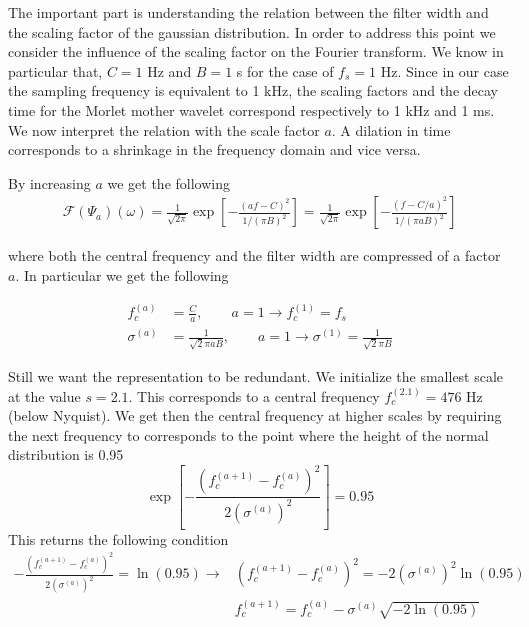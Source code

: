 \documentclass[a4paper]{article}
\begin{document}
The important part is understanding the relation between the filter width and the scaling factor of the gaussian distribution. In order to address this point we consider the influence of the scaling factor on the Fourier transform.
We know in particular that, $C=1$ Hz and $B=1$ s for the case of $f_s=1$ Hz. Since in our case the sampling frequency is equivalent to 1 kHz, the scaling factors and the decay time for the Morlet mother wavelet correspond respectively to 1 kHz and 1 ms.
We now interpret the relation with the scale factor $a$. A dilation in time corresponds to a shrinkage in the frequency domain and vice versa.

By increasing $a$ we get the following
\begin{align*}
 \mathcal{F}(\Psi_a)(\omega) = \frac{1}{\sqrt{2\pi}} \exp\left[-\frac{(a f - C)^2}{1/(\pi B)^2}\right] =
 \frac{1}{\sqrt{2\pi}} \exp\left[-\frac{(f - C/a)^2}{1/(\pi a B)^2}\right]
\end{align*}

where both the central frequency and the filter width are compressed of a factor $a$. In particular we get the following

\begin{align}
  f^{(a)}_c &= \frac{C}{a}, \qquad a=1 \rightarrow f^{(1)}_c=f_s \\
  \sigma^{(a)} &= \frac{1}{\sqrt{2}\pi a B}, \qquad a=1 \rightarrow \sigma^{(1)}= \frac{1}{\sqrt{2}\pi B}
\end{align}

Still we want the representation to be redundant. We initialize the smallest scale at the value $s=2.1$. This corresponds to a central frequency $f^{(2.1)}_c=476$ Hz (below Nyquist). We get then the central frequency at higher scales by requiring the next frequency to corresponds to the point where the height of the normal distribution is 0.95
\begin{equation}
  \exp\left[-\frac{\left(f^{(a+1)}_c-f^{(a)}_c\right)^2}{2 \left(\sigma^{(a)}\right)^2}\right] = 0.95
\end{equation}
This returns the following condition
\begin{align*}
 -\frac{\left(f^{(a+1)}_c-f^{(a)}_c\right)^2}{2 \left(\sigma^{(a)}\right)^2} = \ln(0.95) \rightarrow & \left(f^{(a+1)}_c-f^{(a)}_c\right)^2 = -2 \left(\sigma^{(a)}\right)^2 \ln(0.95) \\
  & f^{(a+1)}_c = f^{(a)}_c - \sigma^{(a)}\sqrt{-2 \ln(0.95)}
\end{align*}
\end{document}
